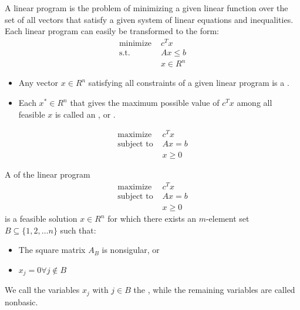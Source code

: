
  \par  A linear program is the problem of minimizing a given linear function over the set of all vectors that satisfy a given system of linear equations and inequalities. Each linear program can easily be transformed to the form:
      \begin{align*}
        \text{minimize } & c^T x \\
        \text{s.t. } & Ax \leq b \\
        & x \in R^n
      \end{align*}

    \begin{itemize}
      \item Any vector $x \in R^n$ satisfying all constraints of a given linear program is a .
      \item Each $x^* \in R^n$ that gives the maximum possible value of $c^T x$ among all feasible $x$ is called an , or .
    \end{itemize}

      \begin{align*}
        \text{maximize } & c^T x \\
        \text{subject to } & Ax = b \\
        & x \geq 0
      \end{align*}

    \par A  of the linear program
      \begin{align*}
        \text{maximize } & c^T x \\
        \text{subject to } & Ax = b \\
        & x \geq 0
      \end{align*}
    is a feasible solution $x \in R^n$ for which there exists an $m$-element set $B \subseteq  \{1, 2, \ldots n\}$ such that:
    \begin{itemize}
      \item The square matrix $A_B$ is nonsigular, or 
      \item $x_j = 0 \forall j \not \in B$
    \end{itemize}

  \par We call the variables $x_j$ with $j \in B$ the , while the remaining variables are called nonbasic.

